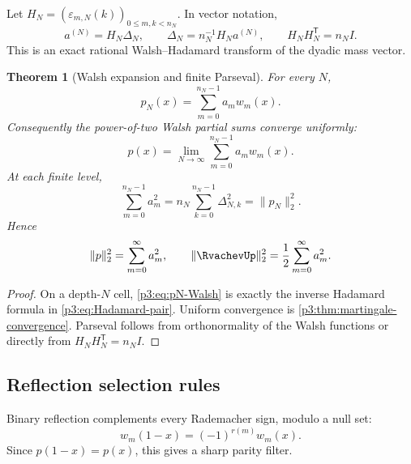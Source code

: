 \documentclass[11pt]{article}
\newtheorem{theorem}{Theorem}[section]
\theoremstyle{definition}
\theoremstyle{remark}
\begin{document}
Let $H_N=(\varepsilon_{m,N}(k))_{0\le m,k<n_N}$.  In vector notation,
\begin{equation}\label{p3:eq:Hadamard-pair}
 a^{(N)}=H_N\Delta_N,
 \qquad
 \Delta_N=n_N^{-1}H_Na^{(N)},
 \qquad H_NH_N^{\mathsf T}=n_NI.
\end{equation}
This is an exact rational Walsh--Hadamard transform of the dyadic mass vector.

\begin{theorem}[Walsh expansion and finite Parseval]
\label{p3:thm:Walsh-expansion}
For every $N$,
\begin{equation}\label{p3:eq:pN-Walsh}
 p_N(x)=\sum_{m=0}^{n_N-1}a_mw_m(x).
\end{equation}
Consequently the power-of-two Walsh partial sums converge uniformly:
\begin{equation}\label{p3:eq:p-Walsh}
 p(x)=\lim_{N\to\infty}\sum_{m=0}^{n_N-1}a_mw_m(x).
\end{equation}
At each finite level,
\begin{equation}\label{p3:eq:Walsh-Parseval-finite}
 \sum_{m=0}^{n_N-1}a_m^2
 =n_N\sum_{k=0}^{n_N-1}\Delta_{N,k}^2
 =\|p_N\|_2^2.
\end{equation}
Hence
\begin{equation}\label{p3:eq:Walsh-Parseval-limit}
 \|p\|_2^2=\sum_{m=0}^\infty a_m^2,
 \qquad
 \|\RvachevUp\|_2^2=\frac12\sum_{m=0}^\infty a_m^2.
\end{equation}
\end{theorem}

\begin{proof}
On a depth-$N$ cell, \eqref{p3:eq:pN-Walsh} is exactly the inverse Hadamard
formula in \eqref{p3:eq:Hadamard-pair}.  Uniform convergence is
\cref{p3:thm:martingale-convergence}.  Parseval follows from orthonormality of the
Walsh functions or directly from $H_NH_N^{\mathsf T}=n_NI$.
\end{proof}

\subsection{Reflection selection rules}

Binary reflection complements every Rademacher sign, modulo a null set:
\begin{equation}\label{p3:eq:Walsh-reflection}
 w_m(1-x)=(-1)^{r(m)}w_m(x).
\end{equation}
Since $p(1-x)=p(x)$, this gives a sharp parity filter.
\end{document}
